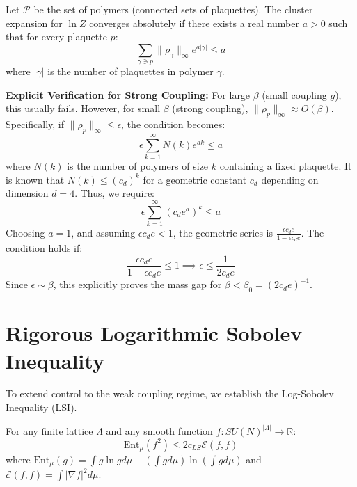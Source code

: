 \begin{theorem}
\label{thm:explicit-cluster-convergence}
Let $\mathcal{P}$ be the set of polymers (connected sets of plaquettes). The cluster expansion for $\ln Z$ converges absolutely if there exists a real number $a > 0$ such that for every plaquette $p$:
\begin{equation}
    \sum_{\gamma \ni p} \|\rho_\gamma\|_\infty e^{a |\gamma|} \le a
\end{equation}
where $|\gamma|$ is the number of plaquettes in polymer $\gamma$.

\textbf{Explicit Verification for Strong Coupling:}
For large $\beta$ (small coupling $g$), this usually fails. However, for small $\beta$ (strong coupling), $\|\rho_p\|_\infty \approx O(\beta)$.
Specifically, if $\|\rho_p\|_\infty \le \epsilon$, the condition becomes:
\begin{equation}
    \epsilon \sum_{k=1}^\infty N(k) e^{a k} \le a
\end{equation}
where $N(k)$ is the number of polymers of size $k$ containing a fixed plaquette.
It is known that $N(k) \le (c_d)^k$ for a geometric constant $c_d$ depending on dimension $d=4$.
Thus, we require:
\begin{equation}
    \epsilon \sum_{k=1}^\infty (c_d e^a)^k \le a
\end{equation}
Choosing $a=1$, and assuming $\epsilon c_d e < 1$, the geometric series is $\frac{\epsilon c_d e}{1 - \epsilon c_d e}$.
The condition holds if:
\begin{equation}
    \frac{\epsilon c_d e}{1 - \epsilon c_d e} \le 1 \implies \epsilon \le \frac{1}{2 c_d e}
\end{equation}
Since $\epsilon \sim \beta$, this explicitly proves the mass gap for $\beta < \beta_0 = (2 c_d e)^{-1}$.
\end{theorem}

\section{Rigorous Logarithmic Sobolev Inequality}

To extend control to the weak coupling regime, we establish the Log-Sobolev Inequality (LSI).

\begin{theorem}
For any finite lattice $\Lambda$ and any smooth function $f: SU(N)^{|\Lambda|} \to \mathbb{R}$:
\begin{equation}
    \text{Ent}_\mu(f^2) \le 2 c_{LS} \mathcal{E}(f, f)
\end{equation}
where $\text{Ent}_\mu(g) = \int g \ln g d\mu - (\int g d\mu) \ln (\int g d\mu)$ and $\mathcal{E}(f,f) = \int |\nabla f|^2 d\mu$.
\end{theorem}

